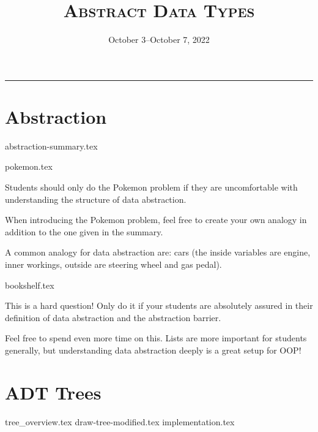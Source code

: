 \documentclass{exam}
\title{\textsc{Abstract Data Types}}
\date{October 3--October 7, 2022}
\begin{document}
\maketitle
\rule{\textwidth}{0.15em}
\fontsize{12}{15}\selectfont



\section{Abstraction}
{abstraction-summary.tex}
\begin{questions}
    {pokemon.tex}
    \begin{questionmeta}
        Students should only do the Pokemon problem if they are uncomfortable with understanding the structure of data abstraction.
    \end{questionmeta}
    \begin{questionmeta}
        When introducing the Pokemon problem, feel free to create your own analogy in addition to the one given in the summary.
    \end{questionmeta}
    \begin{questionmeta}
        A common analogy for data abstraction are: cars (the inside variables are engine, inner workings, outside are steering wheel and gas pedal).
    \end{questionmeta}
    {bookshelf.tex}
    \begin{questionmeta}
        This is a hard question! Only do it if your students are absolutely assured in their definition of data abstraction and the abstraction barrier.
    \end{questionmeta}
    \begin{questionmeta}
        Feel free to spend even more time on this. Lists are more important for students generally, but understanding data abstraction deeply is a great setup for OOP!
    \end{questionmeta}
\end{questions}

\newpage
\section{ADT Trees}
{tree_overview.tex}
{draw-tree-modified.tex}
{implementation.tex}
\end{document}
